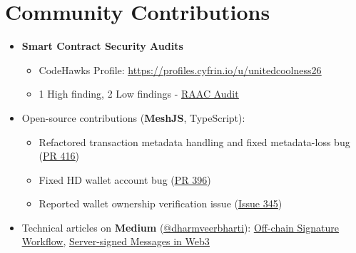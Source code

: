 \documentclass[]{resume-openfont}
\newcommand{\weblink}[2]{\href{#2}{\underline{#1}}}
\begin{document}
\sectionsep


\section{Community Contributions}

\begin{itemize}

    \item \textbf{Smart Contract Security Audits}
    \begin{itemize}
        \item CodeHawks Profile: \weblink{https://profiles.cyfrin.io/u/unitedcoolness26}{https://profiles.cyfrin.io/u/unitedcoolness26}
        \item 1 High finding, 2 Low findings - \weblink{RAAC Audit}{https://codehawks.cyfrin.io/c/2025-02-raac}
    \end{itemize}

    \item Open-source contributions (\textbf{MeshJS}, TypeScript):
    \begin{itemize}
        \item Refactored transaction metadata handling and fixed metadata-loss bug (\weblink{PR 416}{https://github.com/MeshJS/mesh/pull/416})
        \item Fixed HD wallet account bug (\weblink{PR 396}{https://github.com/MeshJS/mesh/pull/396})
        \item Reported wallet ownership verification issue (\weblink{Issue 345}{https://github.com/MeshJS/mesh/issues/345})
    \end{itemize}

    \item Technical articles on \textbf{Medium} (\weblink{@dharmveerbharti}{https://medium.com/@dharmveerbharti}): \weblink{Off-chain Signature Workflow}{https://medium.com/coinsbench/off-chain-transactions-on-blockchain-introducing-signature-based-workflow-4bb3b5a7e72f}, \weblink{Server-signed Messages in Web3}{https://medium.com/@dharmveerbharti/server-signed-messages-in-web3-offloading-on-chain-workload-to-off-chain-518bf9bd364b}

\end{itemize}
\end{document}
